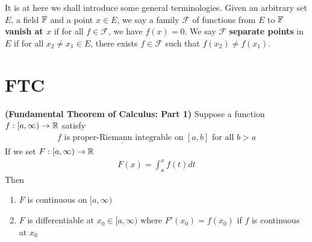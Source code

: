 \documentclass{report}
\begin{document}
\begin{mdframed}
It is at here we shall introduce some general terminologies. Given an arbitrary set $E$, a field  $\mathbb{F}$ and a point $x \in E$, we say a family $\mathcal{F}$ of functions  from $E$ to  $\mathbb{F}$  \textbf{vanish at $x$} if for all $f \in \mathcal{F}$, we have $f(x)=0$. We say $\mathcal{F}$ \textbf{separate points} in $E$ if for all  $x_2\neq x_1 \in E$, there exists $f\in \mathcal{F}$ such that $f(x_2)\neq f(x_1)$. 
\end{mdframed}

\section{FTC}
\begin{theorem}
  \label{FTC1}
\textbf{(Fundamental Theorem of Calculus: Part 1)} Suppose a function $f:[a,\infty )\rightarrow \mathbb{R}$ satisfy
\begin{align*}
f\text{ is $\underline{\text{proper-Riemann integrable}}$ on $[a,b]$  for all $b>a$}
\end{align*}
If we set $F:[a,\infty) \to \mathbb{R}$ 
\begin{align*}
F(x)=\int_a^x f(t)dt
\end{align*}
Then 
\begin{enumerate}[label=(\alph*)]
  \item $F$ is continuous on $[a,\infty )$
  \item $F$ is differentiable at  $x_0 \in [a,\infty )$  where $F'(x_0)=f(x_0)$ if $f$ is continuous at $x_0$
\end{enumerate}
\end{theorem}
\end{document}
